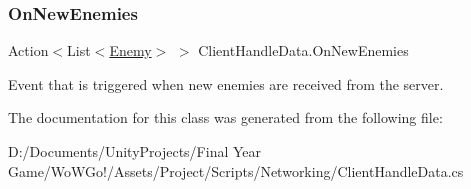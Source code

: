 \subsubsection{\texorpdfstring{OnNewEnemies}{OnNewEnemies}}
{\footnotesize\ttfamily Action$<$List$<$\mbox{\hyperlink{class_enemy}{Enemy}}$>$ $>$ Client\+Handle\+Data.\+On\+New\+Enemies\hspace{0.3cm}{\ttfamily [static]}}



Event that is triggered when new enemies are received from the server. 



The documentation for this class was generated from the following file\+:\begin{DoxyCompactItemize}
\item 
D\+:/\+Documents/\+Unity\+Projects/\+Final Year Game/\+Wo\+W\+Go!/\+Assets/\+Project/\+Scripts/\+Networking/Client\+Handle\+Data.\+cs\end{DoxyCompactItemize}
